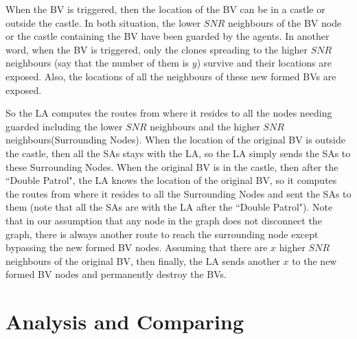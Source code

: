 
When the BV is triggered, then the location of the BV can be in a castle or outside the castle. In both situation, the lower $SNR$ neighbours of the BV node or the castle containing the BV have been guarded by the agents. In another word, when the BV is triggered, only the clones spreading to the higher $SNR$ neighbours (say that the number of them is $y$) survive and their locations are exposed. Also, the locations of all the neighbours of these new formed BVs are exposed. 

So the LA computes the routes from where it resides to all the nodes needing guarded including the lower $SNR$ neighbours and the higher $SNR$ neighbours(Surrounding Nodes). When the location of the original BV is outside the castle, then all the SAs stays with the LA, so the LA simply sends the SAs to these Surrounding Nodes. When the original BV is in the castle, then after the  ``Double Patrol", the LA knows the location of the original BV, so it computes the routes from where it resides to all the Surrounding Nodes and sent the SAs to them (note that all the SAs are with the LA after the  ``Double Patrol"). Note that in our assumption that any node in the graph does not disconnect the graph, there is always another route to reach the surrounding node  except bypassing the new formed BV nodes. Assuming that there are $x$ higher $SNR$ neighbours of the original BV, then finally, the LA sends another $x$ to the new formed BV nodes and permanently destroy the BVs.



\section{Analysis and Comparing}








 